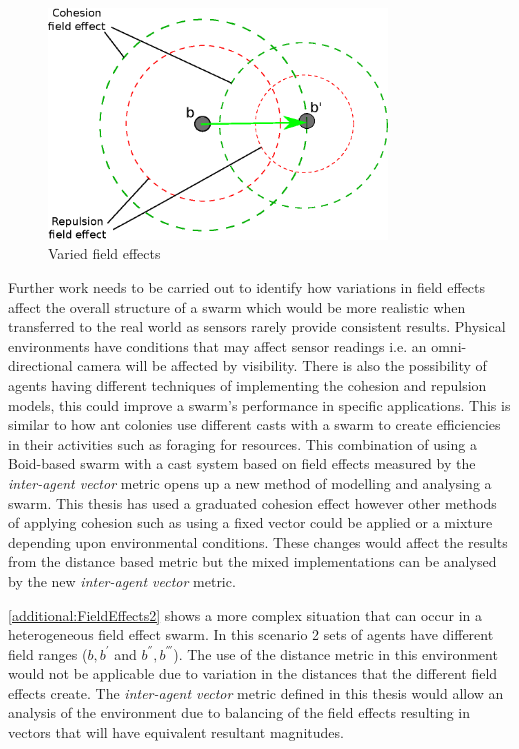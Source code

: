 \begin{figure}[H]
\begin{center}
\includegraphics[width=9cm]{CHAPTER-9/figures/FieldEffects}
\end{center}
\caption{Varied field effects\label{additional:FieldEffects}}
\end{figure}

Further work needs to be carried out to identify how variations in field effects affect the overall structure of a swarm which would be more realistic when transferred to the real world as sensors rarely provide consistent results. Physical environments have conditions that may affect sensor readings i.e. an omni-directional camera will be affected by visibility. There is also the possibility of agents having different techniques of implementing the cohesion and repulsion models, this could improve a swarm's performance in specific applications. This is similar to how ant colonies use different casts with a swarm to create efficiencies in their activities such as foraging for resources. This combination of using a Boid-based swarm with a cast system based on field effects measured by the \textit{inter-agent vector} metric opens up a new method of modelling and analysing a swarm. This thesis has used a graduated cohesion effect however other methods of applying cohesion such as using a fixed vector could be applied or a mixture depending upon environmental conditions. These changes would affect the results from the distance based metric but the mixed implementations can be analysed by the new \textit{inter-agent vector} metric.

\autoref{additional:FieldEffects2} shows a more complex situation that can occur in a heterogeneous field effect swarm. In this scenario 2 sets of agents have different field ranges ($b,b^{'}$ and $b^{''},b^{'''}$). The use of the distance metric in this environment would not be applicable due to variation in the distances that the different field effects create. The \textit{inter-agent vector} metric defined in this thesis would allow an analysis of the environment due to balancing of the field effects resulting in vectors that will have equivalent resultant magnitudes.

